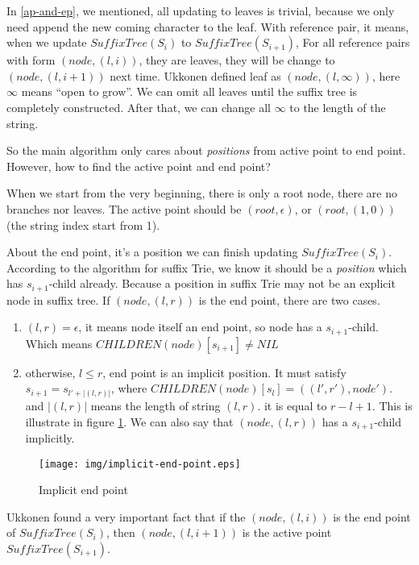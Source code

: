 \documentclass{article}
\begin{document}
In \ref{ap-and-ep}, we mentioned, all updating to leaves is trivial, because we
only need append the new coming character to the leaf. With reference pair,
it means, when we update $SuffixTree(S_i)$ to $SuffixTree(S_{i+1})$, 
For all reference pairs with form $(node, (l, i))$, they are leaves, they will
be change to $(node, (l, i+1))$ next time. Ukkonen defined leaf as
$(node, (l, \infty))$, here $\infty$ means ``open to grow''. We can omit all 
leaves until the suffix tree is completely constructed. After that, we can 
change all $\infty$ to the length of the string.

So the main algorithm only cares about {\em positions} from active point
to end point. However, how to find the active point and end point?

When we start from the very beginning, there is only a root node, there are
no branches nor leaves. The active point should be $(root, \epsilon)$, or
$(root, (1, 0))$ (the string index start from 1).

About the end point, it's a position we can finish updating $SuffixTree(S_i)$.
According to the algorithm for suffix Trie, we know it should be a
{\em position} which has $s_{i+1}$-child already. Because a position
in suffix Trie may not be an explicit node in suffix tree. If $(node, (l, r))$
is the end point, there are two cases.

\begin{enumerate}
\item $(l, r)=\epsilon$, it means node itself an end point, so node has a 
$s_{i+1}$-child. Which means $CHILDREN(node)[s_{i+1}] \ne NIL$
\item otherwise, $l \leq r$, end point is an implicit position. 
It must satisfy $s_{i+1}=s_{l'+|(l, r)|}$, where $CHILDREN(node)[s_l]=((l', r'), node')$.
and $|(l, r)|$ means the length of string $(l, r)$. it is equal to $r-l+1$.
This is illustrate in figure \ref{fig:implicit-end-point}. We can
also say that $(node, (l, r))$ has a $s_{i+1}$-child implicitly.
\end{enumerate}

\begin{figure}[htbp]
   \begin{center}
     \texttt{[image: img/implicit-end-point.eps]}
     \caption{Implicit end point}
     \label{fig:implicit-end-point}
   \end{center}
\end{figure}

Ukkonen found a very important fact that if the $(node, (l, i))$ is the end
point of $SuffixTree(S_i)$, then $(node, (l, i+1))$ is the active point 
$SuffixTree(S_{i+1})$.
\end{document}
